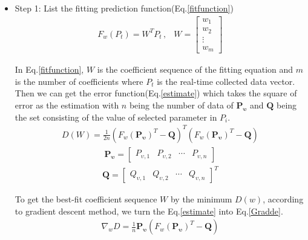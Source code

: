 \begin{itemize}
	\item Step 1: List the fitting prediction function(Eq.\ref{fitfunction})
	\begin{eqnarray}\label{fitfunction}
	F_{w}(P_{t})=W^{T}P_{t}\,,&W=\begin{bmatrix}w_{1}\\ w_{2}\\ \vdots \\ w_{m}\end{bmatrix}
	\end{eqnarray}
	
	In Eq.\ref{fitfunction}, $W$ is the coefficient sequence of the fitting equation and $m$ is the number of coefficients where $P_{t}$ is the real-time collected data vector. Then we can get the error function(Eq.\ref{estimate}) which takes the square of error as the estimation with $n$ being the number of data of $\bm{P_{\upsilon}}$ and $\bm{Q}$ being the set consisting of the value of selected parameter in $P_{i}$.
	\begin{eqnarray}\label{estimate}
		D(W)=\frac{1}{2n}(F_{w}(\bm{P_{\upsilon}})^{T}-\bm{Q})^{T}(F_{w}(\bm{P_{\upsilon}})^{T}-\bm{Q})
	\end{eqnarray}
	\begin{eqnarray}
		\bm{P_{\upsilon}}=\begin{bmatrix}P_{\upsilon,1}&P_{\upsilon,2}  &\cdots  &P_{\upsilon,n} \end{bmatrix}
	\end{eqnarray}
	\begin{eqnarray}
		\bm{Q}=\begin{bmatrix}Q_{\upsilon,1}& Q_{\upsilon,2}& \cdots & Q_{\upsilon,n}\end{bmatrix}^{T}
	\end{eqnarray}
	
	To get the best-fit coefficient sequence $W$ by the minimum $D(w)$, according to gradient descent method, we turn the Eq.\ref{estimate} into Eq.\ref{Gradde}.
	\begin{eqnarray}\label{Gradde}
	\nabla_{w}D=\frac{1}{n}\bm{P_{\upsilon}}(F_{w}(\bm{P_{\upsilon}})^{T}-\bm{Q})
	\end{eqnarray}
	

\end{itemize}
